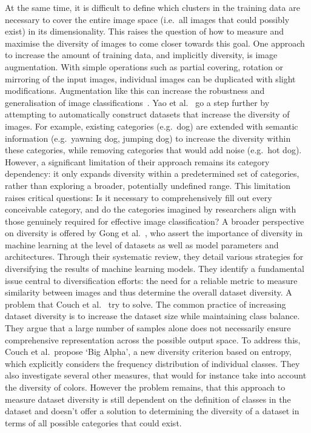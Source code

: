 At the same time, it is difficult to define which clusters in the training data are necessary to cover the entire image space (i.e.\ all images that could possibly exist) in its dimensionality. This raises the question of how to measure and maximise the diversity of images to come closer towards this goal. One approach to increase the amount of training data, and implicitly diversity, is image augmentation. With simple operations such as partial covering, rotation or mirroring of the input images, individual images can be duplicated with slight modifications. Augmentation like this can increase the robustness and generalisation of image classifications~\cite{shortenSurveyImageData2019}. Yao et al.~\cite{yaoAutomaticConstructionDiverse2017} go a step further by attempting to automatically construct datasets that increase the diversity of images. For example, existing categories (e.g.\ dog) are extended with semantic information (e.g.\ yawning dog, jumping dog) to increase the diversity within these categories, while removing categories that would add noise (e.g.\ hot dog). However, a significant limitation of their approach remains its category dependency: it only expands diversity within a predetermined set of categories, rather than exploring a broader, potentially undefined range. This limitation raises critical questions: Is it necessary to comprehensively fill out every conceivable category, and do the categories imagined by researchers align with those genuinely required for effective image classification? A broader perspective on diversity is offered by Gong et al.~\cite{gongDiversityMachineLearning2019}, who assert the importance of diversity in machine learning at the level of datasets as well as model parameters and architectures. Through their systematic review, they detail various strategies for diversifying the results of machine learning models. They identify a fundamental issue central to diversification efforts: the need for a reliable metric to measure similarity between images and thus determine the overall dataset diversity. A problem that Couch et al.~\cite{couchSizeClassBalance2024} try to solve. The common practice of increasing dataset diversity is to increase the dataset size while maintaining class balance. They argue that a large number of samples alone does not necessarily ensure comprehensive representation across the possible output space. To address this, Couch et al.\ propose `Big Alpha', a new diversity criterion based on entropy, which explicitly considers the frequency distribution of individual classes. They also investigate several other measures, that would for instance take into account the diversity of colors. However the problem remains, that this approach to measure dataset diversity is still dependent on the definition of classes in the dataset and doesn't offer a solution to determining the diversity of a dataset in terms of all possible categories that could exist. 


